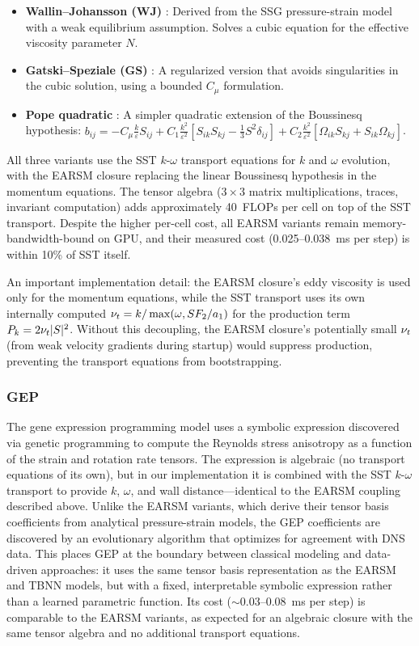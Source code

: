 \begin{itemize}
    \item \textbf{Wallin--Johansson (WJ)} \citep{Wallin2000}: Derived from the SSG pressure-strain model with a weak equilibrium assumption. Solves a cubic equation for the effective viscosity parameter $N$.
    \item \textbf{Gatski--Speziale (GS)} \citep{Gatski1993}: A regularized version that avoids singularities in the cubic solution, using a bounded $C_\mu$ formulation.
    \item \textbf{Pope quadratic} \citep{Pope1975}: A simpler quadratic extension of the Boussinesq hypothesis: $b_{ij} = -C_\mu \frac{k}{\varepsilon} S_{ij} + C_1 \frac{k^2}{\varepsilon^2} [S_{ik}S_{kj} - \frac{1}{3}S^2 \delta_{ij}] + C_2 \frac{k^2}{\varepsilon^2} [\Omega_{ik}S_{kj} + S_{ik}\Omega_{kj}]$.
\end{itemize}

All three variants use the SST $k$-$\omega$ transport equations for $k$ and $\omega$ evolution, with the EARSM closure replacing the linear Boussinesq hypothesis in the momentum equations.
The tensor algebra ($3 \times 3$ matrix multiplications, traces, invariant computation) adds approximately 40~FLOPs per cell on top of the SST transport.
Despite the higher per-cell cost, all EARSM variants remain memory-bandwidth-bound on GPU, and their measured cost (0.025--0.038~ms per step) is within 10\% of SST itself.

An important implementation detail: the EARSM closure's eddy viscosity is used only for the momentum equations, while the SST transport uses its own internally computed $\nu_t = k / \max(\omega, S F_2 / a_1)$ for the production term $P_k = 2 \nu_t |S|^2$.
Without this decoupling, the EARSM closure's potentially small $\nu_t$ (from weak velocity gradients during startup) would suppress production, preventing the transport equations from bootstrapping.

\subsubsection{GEP}

The gene expression programming model \citep{Weatheritt2016} uses a symbolic expression discovered via genetic programming to compute the Reynolds stress anisotropy as a function of the strain and rotation rate tensors.
The expression is algebraic (no transport equations of its own), but in our implementation it is combined with the SST $k$-$\omega$ transport to provide $k$, $\omega$, and wall distance---identical to the EARSM coupling described above.
Unlike the EARSM variants, which derive their tensor basis coefficients from analytical pressure-strain models, the GEP coefficients are discovered by an evolutionary algorithm that optimizes for agreement with DNS data.
This places GEP at the boundary between classical modeling and data-driven approaches: it uses the same tensor basis representation as the EARSM and TBNN models, but with a fixed, interpretable symbolic expression rather than a learned parametric function.
Its cost ($\sim$0.03--0.08~ms per step) is comparable to the EARSM variants, as expected for an algebraic closure with the same tensor algebra and no additional transport equations.

